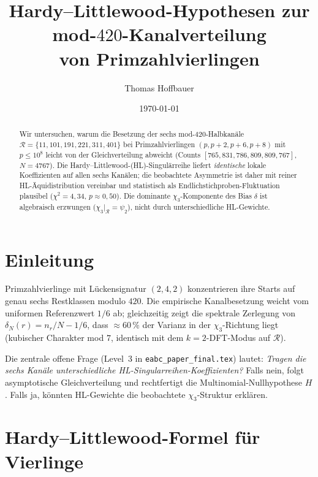 \documentclass[11pt,a4paper]{article}
\title{Hardy--Littlewood-Hypothesen zur\\mod-$420$-Kanalverteilung\\von Primzahlvierlingen}
\author{Thomas Hoffbauer}
\date{\today}
\newcommand{\R}{\mathcal{R}}
\begin{document}
\maketitle

\begin{abstract}
Wir untersuchen, warum die Besetzung der sechs mod-$420$-Halbkanäle
$\R=\{11,101,191,221,311,401\}$ bei Primzahlvierlingen $(p,p+2,p+6,p+8)$
mit $p\le 10^8$ leicht von der Gleichverteilung abweicht
(Counts $[765,831,786,809,809,767]$, $N=4767$).
Die Hardy--Littlewood-(HL)-Singulärreihe liefert \emph{identische}
lokale Koeffizienten auf allen sechs Kanälen; die beobachtete Asymmetrie
ist daher mit reiner HL-Äquidistribution vereinbar und statistisch
als Endlichstichproben-Fluktuation plausibel ($\chi^2=4{,}34$, $p\approx 0{,}50$).
Die dominante $\chi_3$-Komponente des Bias $\delta$ ist algebraisch erzwungen
($\chi_3|_{\R}=\psi_2$), nicht durch unterschiedliche HL-Gewichte.
\end{abstract}

\section{Einleitung}

Primzahlvierlinge mit Lückensignatur $(2,4,2)$ konzentrieren ihre Starts
auf genau sechs Restklassen modulo $420$.
Die empirische Kanalbesetzung weicht vom uniformen Referenzwert $1/6$ ab;
gleichzeitig zeigt die spektrale Zerlegung von $\delta_N(r)=n_r/N-1/6$,
dass $\approx 60\,\%$ der Varianz in der $\chi_3$-Richtung liegt
(kubischer Charakter mod $7$, identisch mit dem $k{=}2$-DFT-Modus auf $\R$).

Die zentrale offene Frage (Level~3 in \texttt{eabc\_paper\_final.tex}) lautet:
\emph{Tragen die sechs Kanäle unterschiedliche HL-Singularreihen-Koeffizienten?}
Falls nein, folgt asymptotische Gleichverteilung und rechtfertigt die
Multinomial-Nullhypothese $H$.
Falls ja, könnten HL-Gewichte die beobachtete $\chi_3$-Struktur erklären.

\section{Hardy--Littlewood-Formel für Vierlinge}
\end{document}

